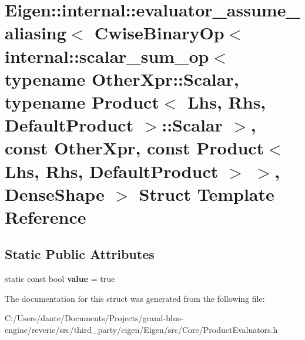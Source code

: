 \hypertarget{struct_eigen_1_1internal_1_1evaluator__assume__aliasing_3_01_cwise_binary_op_3_01internal_1_1scac641579c4e5344f96636c29532d8e354}{}\section{Eigen\+::internal\+::evaluator\+\_\+assume\+\_\+aliasing$<$ Cwise\+Binary\+Op$<$ internal\+::scalar\+\_\+sum\+\_\+op$<$ typename Other\+Xpr\+::Scalar, typename Product$<$ Lhs, Rhs, Default\+Product $>$\+::Scalar $>$, const Other\+Xpr, const Product$<$ Lhs, Rhs, Default\+Product $>$ $>$, Dense\+Shape $>$ Struct Template Reference}
\label{struct_eigen_1_1internal_1_1evaluator__assume__aliasing_3_01_cwise_binary_op_3_01internal_1_1scac641579c4e5344f96636c29532d8e354}
\subsection*{Static Public Attributes}
\begin{DoxyCompactItemize}
\item 
\mbox{\label{struct_eigen_1_1internal_1_1evaluator__assume__aliasing_3_01_cwise_binary_op_3_01internal_1_1scac641579c4e5344f96636c29532d8e354_ae60effa35f65c29890c945271b98a4d6}} 
static const bool {\bfseries value} = true
\end{DoxyCompactItemize}


The documentation for this struct was generated from the following file\+:\begin{DoxyCompactItemize}
\item 
C\+:/\+Users/dante/\+Documents/\+Projects/grand-\/blue-\/engine/reverie/src/third\+\_\+party/eigen/\+Eigen/src/\+Core/Product\+Evaluators.\+h\end{DoxyCompactItemize}
